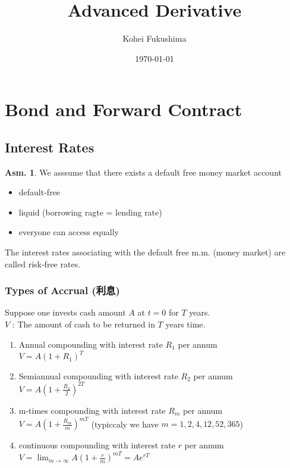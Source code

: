 \documentclass[a4paper,11pt]{jsarticle}
\title{Advanced Derivative}
\author{Kohei Fukushima}
\date{\today}
\theoremstyle{definition}
\newtheorem{asm}{Asm.}[subsection]
\begin{document}
\maketitle
\pagestyle{fancy}
\rhead{\rightmark}


\section{Bond and Forward Contract}
\subsection{Interest Rates}
\begin{asm}
  We asssume that there exists a default free
  money market account
  \begin{itemize}
    \item default-free
    \item liquid (borrowing ragte = lending rate)
    \item everyone can access equally
  \end{itemize}
\end{asm}

The interest rates associating with the default free m.m.
(money market) are called risk-free rates.


\subsubsection{Types of Accrual (利息)}
Suppose one invests cash amount $A$ at $t=0$ for $T$ years. \\
$V$ : The amount of cash to be returned in $T$ years time.

\begin{enumerate}
  \item Annual compounding with interest rate $R_1$ per annum\\
  $V=A(1+R_1)^T$
  \item Semiannual compounding with interest rate $R_2$ per annum\\
  $V=A(1+\frac{R_2}{2})^{2T}$
  \item m-times compounding with interest rate $R_m$ per annum\\
  $V=A(1+\frac{R_m}{m})^{mT}$
  \quad (typiccaly we have $m=1,2,4,12,52,365$)
  \item continuous compounding with interest rate $r$ per annum\\
  $V=\lim_{m\to\infty}A(1+\frac{r}{m})^{mT}=Ae^{rT}$  
\end{enumerate}
\end{document}

